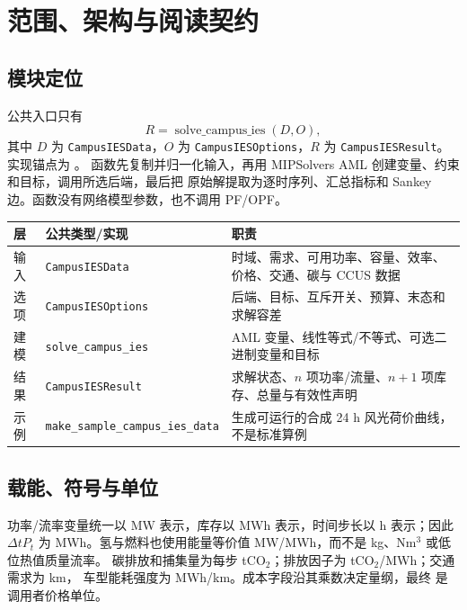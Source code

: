\section{范围、架构与阅读契约}

\subsection{模块定位}

公共入口只有
\begin{equation}
R=\operatorname{solve\_campus\_ies}(D,O),
\end{equation}
其中 $D$ 为 \texttt{CampusIESData}，$O$ 为 \texttt{CampusIESOptions}，$R$ 为
\texttt{CampusIESResult}。实现锚点为
。
函数先复制并归一化输入，再用 MIPSolvers AML 创建变量、约束和目标，调用所选后端，最后把
原始解提取为逐时序列、汇总指标和 Sankey 边。函数没有网络模型参数，也不调用 PF/OPF。

\begin{center}\footnotesize
\begin{tabular}{@{}L{3.0cm}L{4.8cm}L{7.0cm}@{}}
\toprule
层 & 公共类型/实现 & 职责\\
\midrule
输入 & \texttt{CampusIESData} & 时域、需求、可用功率、容量、效率、价格、交通、碳与 CCUS 数据\\
选项 & \texttt{CampusIESOptions} & 后端、目标、互斥开关、预算、末态和求解容差\\
建模 & \texttt{solve\_campus\_ies} & AML 变量、线性等式/不等式、可选二进制变量和目标\\
结果 & \texttt{CampusIESResult} & 求解状态、$n$ 项功率/流量、$n+1$ 项库存、总量与有效性声明\\
示例 & \texttt{make\_sample\_campus\_ies\_data} & 生成可运行的合成 24 h 风光荷价曲线，不是标准算例\\
\bottomrule
\end{tabular}
\end{center}

\subsection{载能、符号与单位}

功率/流率变量统一以 MW 表示，库存以 MWh 表示，时间步长以 h 表示；因此
$\Delta t P_t$ 为 MWh。氢与燃料也使用能量等价值 MW/MWh，而不是 kg、Nm$^3$ 或低位热值质量流率。
碳排放和捕集量为每步 tCO$_2$；排放因子为 tCO$_2$/MWh；交通需求为 km，
车型能耗强度为 MWh/km。成本字段沿其乘数决定量纲，最终  是调用者价格单位。

